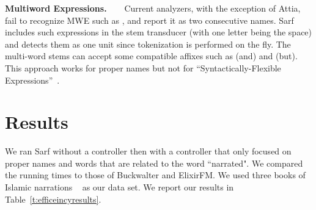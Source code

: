 \documentclass[11pt]{article}
\newcommand{\noTrRL}[1]{\transfalse\RL{#1}\transtrue}
\newcommand{\noTrnoVocRL}[1]{\transfalse\novocalize\noTrRL{#1}\vocalize\transtrue}
\begin{document}
{\bf Multiword Expressions.~~~}
%
Current analyzers, with the exception of Attia, fail to recognize MWE such as \noTrnoVocRL{`bid alkarym}, and 
report it as two consecutive names. 
Sarf includes such expressions in the stem transducer (with one letter being the space) and 
detects them as one unit since tokenization
is performed on the fly. The multi-word stems
can accept some compatible affixes such as  (and) and  (but).
This approach works for proper names but not for ``Syntactically-Flexible Expressions''~\cite{MWE}.

\section{Results}
\label{sec:results}

\begin{table}[tb]
\centering
\caption{Results of Sarf, Buckwalter and ElixirFM.}
\normalsize
\label{t:efficeincyresults}
\end{table}

We ran Sarf without a controller then with a controller that only 
focused on proper names and words that are related to the word ``narrated".
We compared the running times to those of Buckwalter and ElixirFM.
We used three books of Islamic narrations  ~\cite{IbnHanbal,AlTousi,AlKulayni} as our data set.
We report our results in Table~\ref{t:efficeincyresults}.
\end{document}
